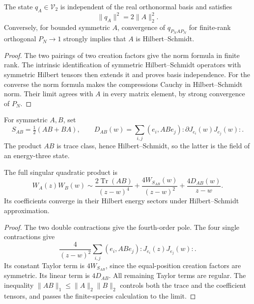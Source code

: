 \begin{proposition}\label{v4-prop:singular-quadratic-isometry}
The state \(q_A\in\mathcal V_2\) is independent
of the real orthonormal basis and satisfies
\[
                         \|q_A\|^2=2\|A\|_2^2.
\]
Conversely, for bounded symmetric \(A\), convergence
of \(q_{P_NAP_N}\) for finite-rank orthogonal
\(P_N\to1\) strongly implies that \(A\) is
Hilbert--Schmidt.
\end{proposition}

\begin{proof}
The two pairings of two creation factors give
the norm formula in finite rank. The intrinsic
identification of symmetric Hilbert--Schmidt
operators with symmetric Hilbert tensors then
extends it and proves basis independence.
For the converse the norm formula makes the
compressions Cauchy in Hilbert--Schmidt norm.
Their limit agrees with \(A\) in every matrix
element, by strong convergence of \(P_N\).
\end{proof}

For symmetric \(A,B\), set
\[
 S_{AB}=\tfrac12(AB+BA),\qquad
 D_{AB}(w)=\sum_{i,j}(e_i,ABe_j)
                      :\partial J_{e_i}(w)J_{e_j}(w):.
\]
The product \(AB\) is trace class, hence
Hilbert--Schmidt, so the latter is the field
of an energy-three state.

\begin{theorem}\label{v4-thm:singular-quadratic-OPE}
The full singular quadratic product is
\begin{equation}\label{v4-eq:singular-quadratic-OPE}
 W_A(z)W_B(w)\sim
    \frac{2\operatorname{Tr}(AB)}{(z-w)^4}
   +\frac{4W_{S_{AB}}(w)}{(z-w)^2}
   +\frac{4D_{AB}(w)}{z-w}.
\end{equation}
Its coefficients converge in their Hilbert
energy sectors under Hilbert--Schmidt approximation.
\end{theorem}

\begin{proof}
The two double contractions give the fourth-order
pole. The four single contractions give
\[
 \frac4{(z-w)^2}\sum_{i,j}(e_i,ABe_j)
                          :J_{e_i}(z)J_{e_j}(w):.
\]
Its constant Taylor term is \(4W_{S_{AB}}\),
since the equal-position creation factors are
symmetric. Its linear term is \(4D_{AB}\).
All remaining Taylor terms are regular.
The inequality \(\|AB\|_1\leq\|A\|_2\|B\|_2\)
controls both the trace and the coefficient
tensors, and passes the finite-species calculation
to the limit.
\end{proof}

